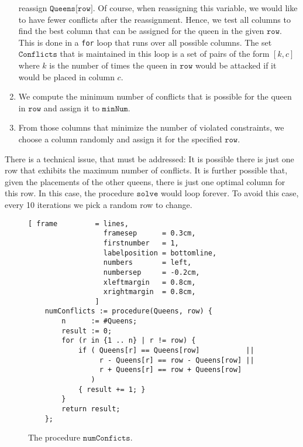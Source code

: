 \begin{enumerate}
      reassign $\texttt{Queens[row]}$.  Of course, when reassigning this variable, we would like to have fewer
      conflicts after the reassignment.  Hence, we test all columns to find the best column that can be
      assigned for the queen in the given $\texttt{row}$.  This is done in a \texttt{for} loop that runs over
      all possible columns.  The set $\texttt{Conflicts}$ that is maintained in this loop is a set of pairs
      of the form $[k, c]$ where $k$ is the number of times the queen in $\texttt{row}$ would be attacked if it
      would be placed in column $c$.
\item We compute the minimum number of conflicts that is possible for the queen in $\texttt{row}$ and assign it
      to $\texttt{minNum}$.
\item From those columns that minimize the number of violated constraints, we choose a column randomly
      and assign it for the specified $\texttt{row}$.
\end{enumerate}
There is a technical issue, that must be addressed:  It is possible there is just one row that exhibits the
maximum number of conflicts.  It is further possible that, given the placements of the other queens, there is
just one optimal column for this row.  In this case, the procedure $\texttt{solve}$ would loop forever.  To
avoid this case, every 10 iterations we pick a random row to change.

\begin{figure}[!ht]
\centering
\begin{Verbatim}[ frame         = lines, 
                  framesep      = 0.3cm, 
                  firstnumber   = 1,
                  labelposition = bottomline,
                  numbers       = left,
                  numbersep     = -0.2cm,
                  xleftmargin   = 0.8cm,
                  xrightmargin  = 0.8cm,
                ]
    numConflicts := procedure(Queens, row) {
        n      := #Queens;
        result := 0;
        for (r in {1 .. n} | r != row) {
            if ( Queens[r] == Queens[row]           ||
                 r - Queens[r] == row - Queens[row] ||
                 r + Queens[r] == row + Queens[row]
               )
            { result += 1; }
        }
        return result;
    };
\end{Verbatim}
\vspace*{-0.3cm}
\caption{The procedure $\texttt{numConficts}$.}
\label{fig:numConficts.stlx}
\end{figure}

